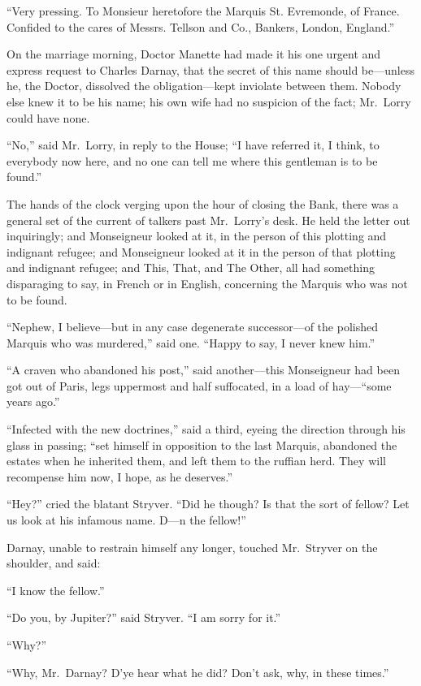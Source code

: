 ``Very pressing.  To Monsieur heretofore the Marquis St. Evremonde,
of France.  Confided to the cares of Messrs. Tellson and Co., Bankers,
London, England.''

On the marriage morning, Doctor Manette had made it his one urgent
and express request to Charles Darnay, that the secret of this name
should be---unless he, the Doctor, dissolved the obligation---kept
inviolate between them.  Nobody else knew it to be his name; his own
wife had no suspicion of the fact; Mr.\ Lorry could have none.

``No,'' said Mr.\ Lorry, in reply to the House; ``I have referred it,
I think, to everybody now here, and no one can tell me where this
gentleman is to be found.''

The hands of the clock verging upon the hour of closing the Bank,
there was a general set of the current of talkers past Mr.\ Lorry's
desk.  He held the letter out inquiringly; and Monseigneur looked at
it, in the person of this plotting and indignant refugee; and
Monseigneur looked at it in the person of that plotting and indignant
refugee; and This, That, and The Other, all had something disparaging
to say, in French or in English, concerning the Marquis who was not
to be found.

``Nephew, I believe---but in any case degenerate successor---of the
polished Marquis who was murdered,'' said one.  ``Happy to say, I never
knew him.''

``A craven who abandoned his post,'' said another---this Monseigneur
had been got out of Paris, legs uppermost and half suffocated, in a
load of hay---``some years ago.''

``Infected with the new doctrines,'' said a third, eyeing the direction
through his glass in passing; ``set himself in opposition to the last
Marquis, abandoned the estates when he inherited them, and left them
to the ruffian herd.  They will recompense him now, I hope,
as he deserves.''

``Hey?'' cried the blatant Stryver.  ``Did he though?  Is that the sort
of fellow?  Let us look at his infamous name.  D---n the fellow!''

Darnay, unable to restrain himself any longer, touched Mr.\ Stryver on
the shoulder, and said:

``I know the fellow.''

``Do you, by Jupiter?'' said Stryver.  ``I am sorry for it.''

``Why?''

``Why, Mr.\ Darnay?  D'ye hear what he did?  Don't ask, why,
in these times.''

